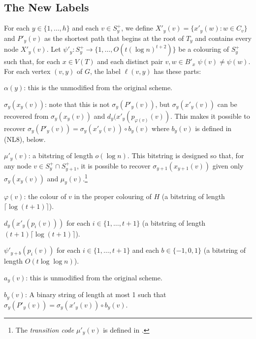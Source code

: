 \documentclass{patmorin}
\begin{document}
\subsection{The New Labels}

For each $y\in\{1,\ldots,h\}$ and each $v\in S^+_y$, we define $X'_y(v)=\{x'_y(w): w\in C_v\}$ and $P'_y(v)$ as the shortest path that begins at the root of $T_y$ and contains every node $X'_y(v)$.  Let $\psi'_y:S^+_y\to\{1,\ldots,O(t(\log n)^{t+2})\}$ be a colouring of $S^+_y$ such that, for each $x\in V(T)$ and each distinct pair $v,w\in B'_x$ $\psi(v)\neq\psi(w)$.  For each vertex $(v,y)$ of $G$, the label $\ell(v,y)$ has these parts:

\begin{compactenum}[(NL1)]
    \item $\alpha(y)$: this is the unmodified from the original scheme.

    \item $\sigma_y(x_y(v))$: note that this is not $\sigma_y(P'_y(v))$, but
    $\sigma_y(x'_y(v))$ can be recovered from $\sigma_y(x_y(v))$ and $d_y(x'_y(p_{\varphi(v)}(v))$. This makes it possible to recover $\sigma_y(P'_y(v))=\sigma_y(x'_y(v))\mathbin{\circ} b_y(v)$ where $b_y(v)$ is defined in (NL8), below.

    \item $\mu'_y(v)$: a bitstring of length $o(\log n)$.  This bitstring is designed so that, for any node $v\in S^+_y\cap S^+_{y+1}$, it is possible to recover $\sigma_{y+1}(x_{y+1}(v))$ given only $\sigma_y(x_y(v))$ and $\mu_y(v)$.\footnote{The \emph{transition code} $\mu'_y(v)$ is defined in \cite[Section~5.3]{dujmovic.esperet.ea:adjacency}.}

    \item $\varphi(v)$: the colour of $v$ in the proper colouring of $H$ (a bitstring of length $\lceil\log(t+1)\rceil$).

    \item $d_y(x'_y(p_i(v)))$ for each $i\in\{1,\ldots,t+1\}$ (a bitstring of length $(t+1)\lceil\log(t+1)\rceil$).

    \item $\psi'_{y+b}(p_i(v))$ for each $i\in\{1,\ldots,t+1\}$ and each $b\in\{-1,0,1\}$ (a bitstring of length $O(t\log\log n)$).\label{psi-prime}

    \item $a_y(v)$: this is unmodified from the original scheme.

    \item $b_y(v)$: A binary string of length at most 1 such that $\sigma_y(P'_y(v))=\sigma_y(x'_y(v))\mathbin{\circ}b_y(v)$.
\end{compactenum}
\end{document}

